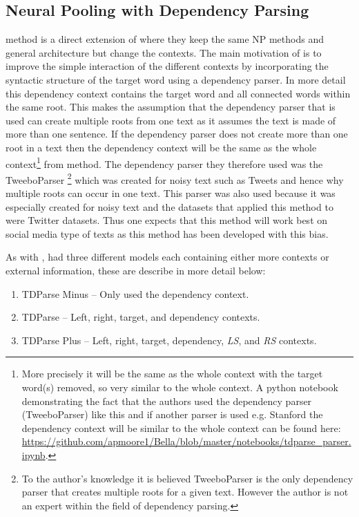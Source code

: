 \subsection{Neural Pooling with Dependency Parsing}
\citet{wang-etal-2017-tdparse} method is a direct extension of \citet{vo2015target} where they keep the same NP methods and general architecture but change the contexts. The main motivation of \citet{wang-etal-2017-tdparse} is to improve the simple interaction of the different contexts by incorporating the syntactic structure of the target word using a dependency parser. In more detail this dependency context contains the target word and all connected words within the same root. This makes the assumption that the dependency parser that is used can create multiple roots from one text as it assumes the text is made of more than one sentence. If the dependency parser does not create more than one root in a text then the dependency context will be the same as the whole context\footnote{More precisely it will be the same as the whole context with the target word(s) removed, so very similar to the whole context. A python notebook demonstrating the fact that the authors used the dependency parser (TweeboParser) like this and if another parser is used e.g. Stanford the dependency context will be similar to the whole context can be found here: \url{https://github.com/apmoore1/Bella/blob/master/notebooks/tdparse\_parser.ipynb}.} from \citet{vo2015target} method. The dependency parser they therefore used was the TweeboParser \citep{kong-etal-2014-dependency}\footnote{To the author's knowledge it is believed TweeboParser is the only dependency parser that creates multiple roots for a given text. However the author is not an expert within the field of dependency parsing.} which was created for noisy text such as Tweets and hence why multiple roots can occur in one text. This parser was also used because it was especially created for noisy text and the datasets that \citet{wang-etal-2017-tdparse} applied this method to were Twitter datasets. Thus one expects that this method will work best on social media type of texts as this method has been developed with this bias.

As with \citet{vo2015target}, \citet{wang-etal-2017-tdparse} had three different models each containing either more contexts or external information, these are describe in more detail below:

\begin{enumerate}
    \item TDParse Minus -- Only used the dependency context.
    \item TDParse -- Left, right, target, and dependency contexts.
    \item TDParse Plus -- Left, right, target, dependency, \textit{LS}, and \textit{RS} contexts.
\end{enumerate}

